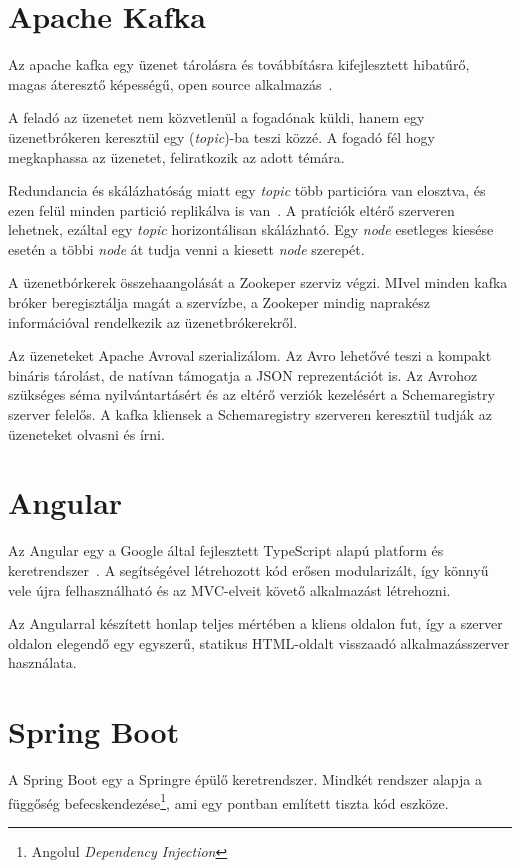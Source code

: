 \section{Apache Kafka}\label{sec:apache_kafka}
Az apache kafka egy üzenet tárolásra és továbbításra kifejlesztett hibatűrő, magas áteresztő képességű, open source alkalmazás~\cite{OReally_Kafka}.

A feladó az üzenetet nem közvetlenül a fogadónak küldi, hanem egy üzenetbrókeren keresztül egy (\textit{topic})-ba teszi közzé. A fogadó fél hogy megkaphassa az üzenetet, feliratkozik az adott témára. 

Redundancia és skálázhatóság miatt egy \textit{topic} több particióra van elosztva, és ezen felül minden partició replikálva is van~\cite{OReally_Kafka_Internals}. A pratíciók eltérő szerveren lehetnek, ezáltal egy \textit{topic} horizontálisan skálázható. Egy \textit{node} esetleges kiesése esetén a többi \textit{node} át tudja venni a kiesett \textit{node} szerepét.

A üzenetbórkerek összehaangolását a Zookeper szerviz végzi. MIvel minden kafka bróker beregisztálja magát a szervízbe, a Zookeper mindig naprakész információval rendelkezik az üzenetbrókerekről.

Az üzeneteket Apache Avroval szerializálom. Az Avro lehetővé teszi a kompakt bináris tárolást, de natívan támogatja a JSON reprezentációt is. Az Avrohoz szükséges séma nyilvántartásért és az eltérő verziók kezelésért a Schemaregistry szerver felelős. A kafka kliensek a Schemaregistry szerveren keresztül tudják az üzeneteket olvasni és írni. 



\section{Angular}\label{sec:angular}
Az \foreignlanguage{british}{Angular} egy a \foreignlanguage{british}{Google} által fejlesztett \foreignlanguage{british}{TypeScript} alapú platform és		 keretrendszer~\cite{angular_docs}. A segítségével létrehozott kód erősen modularizált, így könnyű vele újra felhasználható és az MVC-elveit követő alkalmazást létrehozni.

Az Angularral készített honlap teljes mértében a kliens oldalon fut, így a szerver oldalon elegendő egy egyszerű, statikus HTML-oldalt visszaadó alkalmazásszerver használata.


\section{Spring Boot}\label{sec:spring_boot}
A \foreignlanguage{british}{Spring Boot} egy a Springre épülő keretrendszer. Mindkét rendszer alapja a függőség befecskendezése\footnote{Angolul \foreignlanguage{british}{\textit{Dependency Injection}}}, ami egy  pontban említett tiszta kód \cite{clean_code_chapter_systems} eszköze.

